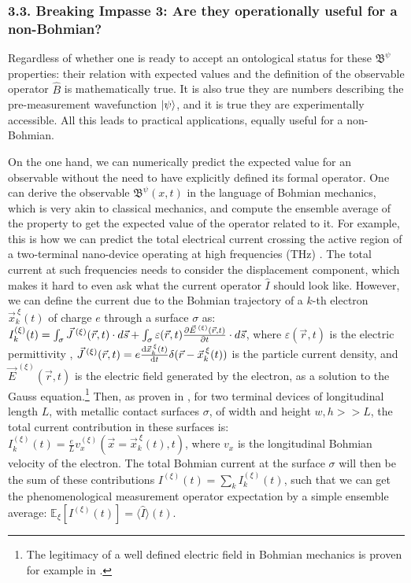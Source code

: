 \documentclass[11pt, a4paper]{article} %
\newcommand{\B}{\mathfrak{B}}
\begin{document}
\subsubsection*{3.3. Breaking Impasse 3: Are they operationally useful for a non-Bohmian?}
\vspace{-0.15cm}

Regardless of whether one is ready to accept an ontological status for these $\B^\psi$ properties: their relation with expected values and the definition of the observable operator $\hat{B}$ is mathematically true. It is also true they are numbers describing the pre-measurement wavefunction $\ket{\psi}$, and it is true they are experimentally accessible. All this leads to practical applications, equally useful for a non-Bohmian.

On the one hand, we can numerically predict the expected value for an observable without the need to have explicitly defined its formal operator. One can derive the observable $\B^\psi(x,t)$ in the language of Bohmian mechanics, which is very akin to classical mechanics, and compute the ensemble average of the property to get the expected value of the operator related to it. For example, this is how we can predict the total electrical current crossing the active region of a two-terminal nano-device operating at high frequencies (THz) \cite{equiv, Pel}. The total current at such frequencies needs to consider the displacement component, which makes it hard to even ask what the current operator $\hat{I}$ should look like. However, we can define the current due to the Bohmian trajectory of a $k$-th electron $\vec{x}_k^{\:\xi}(t)$ of charge $e$ through a surface $\sigma$ as: $I_k^{(\xi)}(t)=\int_\sigma \vec{J}^{\:(\xi)}(\vec{r},t)\cdot d\vec{s}+\int_\sigma \varepsilon(\vec{r},t)\pdv{\vec{E}^{\:(\xi)}(\vec{r},t)}{t}\cdot d\vec{s}$, where $\varepsilon(\vec{r},t)$ is the electric permittivity , $\vec{J}^{\:(\xi)}(\vec{r},t)=e\dv{\vec{x}_k^{\:\xi}(t)}{t}\delta(\vec{r}-\vec{x}_k^{\:\xi}(t))$ is the particle current density, and $\vec{E}^{\:(\xi)}(\vec{r},t)$ is the electric field generated by the electron, as a solution to the Gauss equation.\footnote{The legitimacy of a well defined electric field in Bohmian mechanics is proven for example in \cite{lightMatter}.} Then, as proven in \cite{Pel}, for two terminal devices of longitudinal length $L$, with metallic contact surfaces $\sigma$, of width and height $w,h>>L$, the total current contribution in these surfaces is: $I^{(\xi)}_k(t)=\frac{e}{L}v_x^{(\xi)}(\vec{x}=\vec{x}_k^{\:\xi}(t), t) $, where $v_x$ is the longitudinal Bohmian velocity of the electron. The total Bohmian current at the surface $\sigma$ will then be the sum of these contributions $I^{(\xi)}(t)=\sum_k I^{(\xi)}_k(t)$, such that we can get the phenomenological measurement operator expectation by a simple ensemble average: $\mathbb{E}_\xi [I^{(\xi)}(t)]=\langle \hat{I}\rangle(t)$. 
\end{document}
